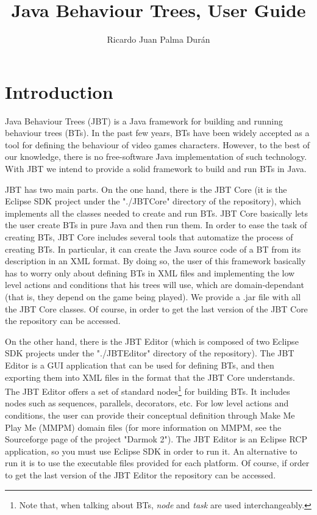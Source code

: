 \documentclass[a4paper]{article}
\title{Java Behaviour Trees, User Guide}
\author{Ricardo Juan Palma Dur\'an}
\begin{document}
\maketitle
\vspace{-0.5cm}

\tableofcontents
\clearpage

\section{Introduction}

Java Behaviour Trees (JBT) is a Java framework for building and running behaviour trees (BTs). In the past few years, BTs have been widely accepted as a tool for defining the behaviour of video games characters. However, to the best of our knowledge, there is no free-software Java implementation of such technology. With JBT we intend to provide a solid framework to build and run BTs in Java.

JBT has two main parts. On the one hand, there is the JBT Core (it is the Eclipse SDK project under the "./JBTCore" directory of the repository), which implements all the classes needed to create and run BTs. JBT Core basically lets the user create BTs in pure Java and then run them. In order to ease the task of creating BTs, JBT Core includes several tools that automatize the process of creating BTs. In particular, it can create the Java source code of a BT from its description in an XML format. By doing so, the user of this framework basically has to worry only about defining BTs in XML files and implementing the low level actions and conditions that his trees will use, which are domain-dependant (that is, they depend on the game being played). We provide a .jar file with all the JBT Core classes. Of course, in order to get the last version of the JBT Core the repository can be accessed.

On the other hand, there is the JBT Editor (which is composed of two Eclipse SDK projects under the "./JBTEditor" directory of the repository). The JBT Editor is a GUI application that can be used for defining BTs, and then exporting them into XML files in the format that the JBT Core understands. The JBT Editor offers a set of standard nodes\footnote{Note that, when talking about BTs, \textit{node} and \textit{task} are used interchangeably.} for building BTs. It includes nodes such as sequences, parallels, decorators, etc. For low level actions and conditions, the user can provide their conceptual definition through Make Me Play Me (MMPM) domain files (for more information on MMPM, see the Sourceforge page of the project "Darmok 2"). The JBT Editor is an Eclipse RCP application, so you must use Eclipse SDK in order to run it. An alternative to run it is to use the executable files provided for each platform. Of course, if order to get the last version of the JBT Editor the repository can be accessed.
\end{document}

